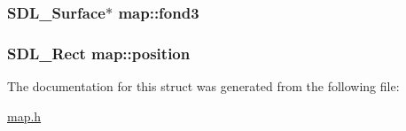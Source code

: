 \subsubsection[{\texorpdfstring{fond3}{fond3}}]{\setlength{\rightskip}{0pt plus 5cm}S\+D\+L\+\_\+\+Surface$\ast$ map\+::fond3}\hypertarget{structmap_a9ed7f9e559bd649cd29c8961bb647b5a}{}\label{structmap_a9ed7f9e559bd649cd29c8961bb647b5a}
\subsubsection[{\texorpdfstring{position}{position}}]{\setlength{\rightskip}{0pt plus 5cm}S\+D\+L\+\_\+\+Rect map\+::position}\hypertarget{structmap_a22eebe2fbf7d3d3fea525b97643fb9fc}{}\label{structmap_a22eebe2fbf7d3d3fea525b97643fb9fc}


The documentation for this struct was generated from the following file\+:\begin{DoxyCompactItemize}
\item 
\hyperlink{map_8h}{map.\+h}\end{DoxyCompactItemize}
